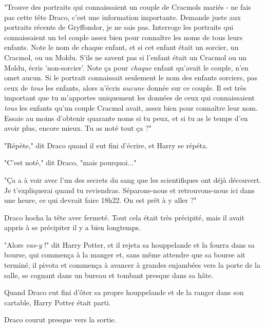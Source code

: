 "Trouve des portraits qui connaissaient un couple de Cracmols mariés - ne fais pas cette tête Draco, c'est une information importante. Demande juste aux portraits récents de Gryffondor, je ne sais pas. Interroge les portraits qui connaissaient un tel couple assez bien pour connaître les noms de tous leurs enfants. Note le nom de chaque enfant, et si cet enfant était un sorcier, un Cracmol, ou un Moldu. S'ils ne savent pas si l'enfant était un Cracmol ou un Moldu, écris 'non-sorcier'. Note ça pour \emph{chaque}  enfant qu'avait le couple, n'en omet aucun. Si le portrait connaissait seulement le nom des enfants sorciers, pas ceux de \emph{tous}  les enfants, alors n'écris \emph{aucune}  donnée sur ce couple. Il est très important que tu m'apportes uniquement les données de ceux qui connaissaient \emph{tous}  les enfants qu'un couple Cracmol avait, assez bien pour connaître leur nom. Essaie au moins d'obtenir quarante noms si tu peux, et si tu as le temps d'en avoir plus, encore mieux. Tu as noté tout ça ?"

"Répète," dit Draco quand il eut fini d'écrire, et Harry se répéta.

"C'est noté," dit Draco, "mais pourquoi..."

"Ça a à voir avec l'un des secrets du sang que les scientifiques ont déjà découvert. Je t'expliquerai quand tu reviendras. Séparons-nous et retrouvons-nous ici dans une heure, ce qui devrait faire 18h22. On est prêt à y aller ?"

Draco hocha la tête avec fermeté. Tout cela était très précipité, mais il avait appris à se précipiter il y a bien longtemps.

"Alors \emph{vas-y}  !" dit Harry Potter, et il rejeta sa houppelande et la fourra dans sa bourse, qui commença à la manger et, sans même attendre que sa bourse ait terminé, il pivota et commença à avancer à grandes enjambées vers la porte de la salle, se cognant dans un bureau et tombant presque dans sa hâte.

Quand Draco eut fini d'ôter sa propre houppelande et de la ranger dans son cartable, Harry Potter était parti.

Draco courut presque vers la sortie.

